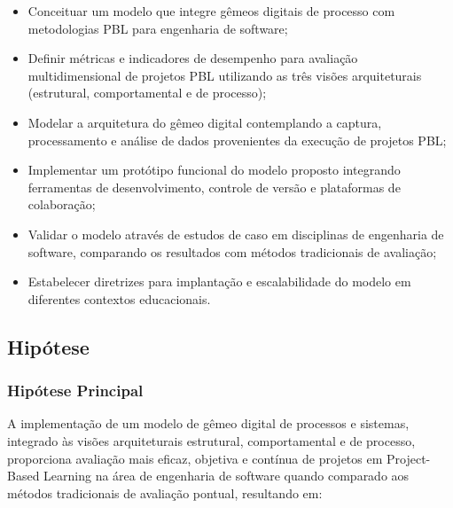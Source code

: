 \documentclass[12pt,a4paper]{article}
\begin{document}
\begin{itemize}
\item Conceituar um modelo que integre gêmeos digitais de processo com metodologias PBL para engenharia de software;
\item Definir métricas e indicadores de desempenho para avaliação multidimensional de projetos PBL utilizando as três visões arquiteturais (estrutural, comportamental e de processo);
\item Modelar a arquitetura do gêmeo digital contemplando a captura, processamento e análise de dados provenientes da execução de projetos PBL;
\item Implementar um protótipo funcional do modelo proposto integrando ferramentas de desenvolvimento, controle de versão e plataformas de colaboração;
\item Validar o modelo através de estudos de caso em disciplinas de engenharia de software, comparando os resultados com métodos tradicionais de avaliação;
\item Estabelecer diretrizes para implantação e escalabilidade do modelo em diferentes contextos educacionais.
\end{itemize}

\subsection{Hipótese}

\subsubsection{Hipótese Principal}

A implementação de um modelo de gêmeo digital de processos e sistemas, integrado às visões arquiteturais estrutural, comportamental e de processo, proporciona avaliação mais eficaz, objetiva e contínua de projetos em Project-Based Learning na área de engenharia de software quando comparado aos métodos tradicionais de avaliação pontual, resultando em:
\end{document}
